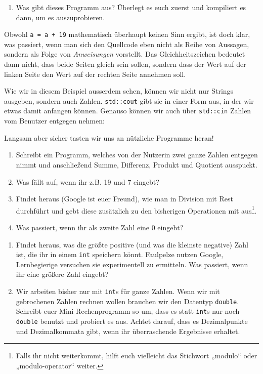 \begin{praxis}
	\begin{enumerate}
		\item Was gibt dieses Programm aus? Überlegt es euch zuerst und kompiliert
		      es dann, um es auszuprobieren.
	\end{enumerate}

	Obwohl \texttt{a = a + 19} mathematisch überhaupt keinen Sinn ergibt, ist doch
	klar, was passiert, wenn man sich den Quellcode eben nicht als Reihe von
	Aussagen, sondern als Folge von \emph{Anweisungen} vorstellt. Das
	Gleichheitszeichen bedeutet dann nicht, dass beide Seiten gleich sein sollen,
	sondern dass der Wert auf der linken Seite den Wert auf der rechten Seite
	annehmen soll.

	Wie wir in diesem Beispiel ausserdem sehen, können wir nicht nur Strings
	ausgeben, sondern auch Zahlen. \texttt{std::cout} gibt sie in einer Form aus,
	in der wir etwas damit anfangen können. Genauso können wir auch über
	\texttt{std::cin} Zahlen vom Benutzer entgegen nehmen:


	Langsam aber sicher tasten wir uns an nützliche Programme heran!

	\begin{enumerate}[resume]
		\item Schreibt ein Programm, welches von der Nutzerin zwei ganze Zahlen
		      entgegen nimmt und anschließend Summe, Differenz, Produkt und Quotient
		      ausspuckt.
		\item Was fällt auf, wenn ihr z.B. 19 und 7 eingebt?
		\item Findet heraus (Google ist euer Freund), wie man in \Cpp Division mit
		      Rest durchführt und gebt diese zusätzlich zu den bisherigen Operationen
		      mit aus\footnote{Falls ihr nicht weiterkommt, hilft euch vielleicht das
			      Stichwort „modulo“ oder „modulo-operator“ weiter.}.
		\item Was passiert, wenn ihr als zweite Zahl eine 0 eingebt?
	\end{enumerate}
\end{praxis}

\begin{spiel}
	\begin{enumerate}
		\item Findet heraus, was die größte positive (und was die kleinste
		      negative) Zahl ist, die ihr in einem \texttt{int} speichern könnt.
		      Faulpelze nutzen Google, Lernbegierige versuchen sie experimentell zu
		      ermitteln. Was passiert, wenn ihr eine größere Zahl eingebt?
		\item Wir arbeiten bisher nur mit \texttt{int}s für ganze Zahlen. Wenn wir
		      mit gebrochenen Zahlen rechnen wollen brauchen wir den Datentyp
		      \texttt{double}. Schreibt euer Mini Rechenprogramm so um, dass es statt
		      \texttt{int}s nur noch \texttt{double} benutzt und probiert es aus.
		      Achtet darauf, dass es Dezimalpunkte und Dezimalkommata gibt, wenn ihr
		      überraschende Ergebnisse erhaltet.
	\end{enumerate}
\end{spiel}

